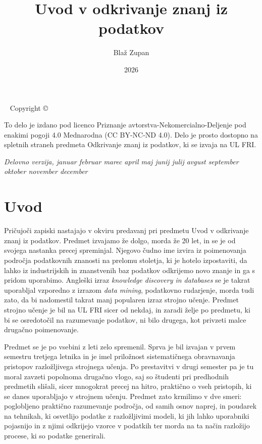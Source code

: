 \documentclass[nohyper,nobib]{tufte-book}
\title{Uvod v odkrivanje znanj iz podatkov}
\date{2026}
\author[Blaž Zupan]{Blaž Zupan}
\newcommand{\monthyear}{%
  \ifcase\month
  \or januar%
  \or februar%
  \or marec%
  \or april%
  \or maj%
  \or junij%
  \or julij%
  \or avgust%
  \or september%
  \or oktober%
  \or november%
  \or december%
  \fi
  \space\number\year
}
\begin{document}
\frontmatter

\maketitle


\newpage
\begin{fullwidth}
~\vfill
\thispagestyle{empty}
\setlength{\parindent}{0pt}
\setlength{\parskip}{\baselineskip}
Copyright \copyright\ \the\year\ \thanklessauthor

\par{}

\par To delo je izdano pod licenco Priznanje avtorstva-Nekomercialno-Deljenje pod enakimi pogoji 4.0 Mednarodna (CC BY-NC-ND 4.0). Delo je prosto dostopno na spletnih straneh predmeta Odkrivanje znanj iz podatkov, ki se izvaja na UL FRI.

\par\textit{Delovno verzija, \monthyear}
\end{fullwidth}

\tableofcontents


\cleardoublepage
\chapter*{Uvod}

Pričujoči zapiski nastajajo v okviru predavanj pri predmetu Uvod v odkrivanje znanj iz podatkov. Predmet izvajamo že dolgo, morda že 20 let, in se je od svojega nastanka precej spreminjal. Njegovo čudno ime izvira iz poimenovanja področja podatkovnih znanosti na prelomu stoletja, ki je hotelo izpostaviti, da lahko iz industrijskih in znanstvenih baz podatkov odkrijemo novo znanje in ga s pridom uporabimo. Angleški izraz {\em knowledge discovery in databases} se je takrat uporabljal vzporedno z izrazom {\em data mining}, podatkovno rudarjenje, morda tudi zato, da bi nadomestil takrat manj popularen izraz strojno učenje. Predmet strojno učenje je bil na UL FRI sicer od nekdaj, in zaradi želje po predmetu, ki bi se osredotočil na razumevanje podatkov, ni bilo drugega, kot privzeti malce drugačno poimenovanje.

Predmet se je po vsebini z leti zelo spremenil. Sprva je bil izvajan v prvem semestru tretjega letnika in je imel priložnost sistematičnega obravnavanja pristopov razložljivega strojnega učenja. Po prestavitvi v drugi semester pa je tu moral zavzeti popolnoma drugačno vlogo, saj so študenti pri predhodnih predmetih slišali, sicer mnogokrat precej na hitro, praktično o vseh pristopih, ki se danes uporabljajo v strojnem učenju. Predmet zato krmilimo v dve smeri: poglobljeno praktično razumevanje področja, od samih osnov naprej, in poudarek na tehnikah, ki osvetlijo podatke z razložljivimi modeli, ki jih lahko uporabniki pojasnijo in z njimi odkrijejo vzorce v podatkih ter morda na ta način razložijo procese, ki so podatke generirali.
\end{document}
